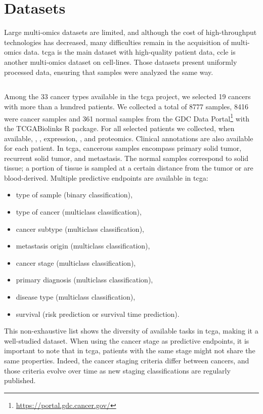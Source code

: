 \documentclass[../main.tex]{subfiles}
\begin{document}
\section{Datasets}
	Large multi-omics datasets are limited, and although the cost of high-throughput technologies has decreased, many difficulties remain in the acquisition of multi-omics data.
	\Gls{tcga} is the main dataset with high-quality patient data, \gls{ccle} is another multi-omics dataset on cell-lines.
	Those datasets present uniformly processed data, ensuring that samples were analyzed the same way.

	\subsection{}\label{sec:data_tcga}
		Among the 33 cancer types available in the \gls{tcga} project, we selected 19 cancers with more than a hundred patients.
		We collected a total of 8777 samples, 8416 were cancer samples and 361 normal samples from the GDC Data Portal\footnote{\url{https://portal.gdc.cancer.gov/}} with the \textsf{TCGABiolinks} R package.
		For all selected patients we collected, when available, , ,  expression, , and proteomics.
		Clinical annotations are also available for each patient.
		In \gls{tcga}, cancerous samples encompass primary solid tumor, recurrent solid tumor, and metastasis.
		The normal samples correspond to solid tissue; a portion of tissue is sampled at a certain distance from the tumor or are blood-derived.
		Multiple predictive endpoints are available in \gls{tcga}:
		\begin{itemize}[nosep]
			\item type of sample (binary classification),
			\item type of cancer (multiclass classification),
			\item cancer subtype (multiclass classification),
			\item metastasis origin (multiclass classification),
			\item cancer stage (multiclass classification),
			\item primary diagnosis (multiclass classification),
			\item disease type (multiclass classification),
			\item survival (risk prediction or survival time prediction).
		\end{itemize}
		This non-exhaustive list shows the diversity of available tasks in \gls{tcga}, making it a well-studied dataset.
		When using the cancer stage as predictive endpoints, it is important to note that in \gls{tcga}, patients with the same stage might not share the same properties.
		Indeed, the cancer staging criteria differ between cancers, and those criteria evolve over time as new staging classifications are regularly published.
\end{document}
